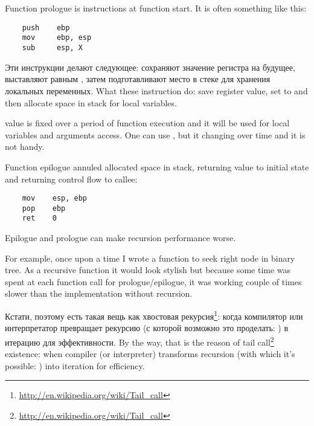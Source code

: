 ﻿\section{}
\label{sec:prologepilog}

{Function prologue is instructions at function start. It is often something like this:}

\begin{lstlisting}
    push    ebp
    mov     ebp, esp
    sub     esp, X
\end{lstlisting}

\IFRU
{Эти инструкции делают следующее: сохраняют значение регистра \EBP на будущее, выставляют \EBP равным \ESP, 
затем подготавливают место в стеке для хранения локальных переменных.}
{What these instruction do: save \EBP register value, set \EBP to \ESP and then allocate space in stack 
for local variables.}

{\EBP value is fixed over a period of function execution and it will be used for local variables and 
arguments access. 
One can use \ESP, but it changing over time and it is not handy.}

{Function epilogue annuled allocated space in stack, returning \EBP value to initial state 
and returning control flow to callee:}

\begin{lstlisting}
    mov    esp, ebp
    pop    ebp
    ret    0
\end{lstlisting}

{Epilogue and prologue can make recursion performance worse.

For example, once upon a time I wrote a function to seek right node in binary tree. 
As a recursive function it would look stylish but because some time was spent at each function call
for prologue/epilogue, it was working couple of times slower than the implementation 
without recursion.}

\newcommand{\URLT}{\url{http://en.wikipedia.org/wiki/Tail_call}}
\IFRU
{Кстати, поэтому есть такая вещь как хвостовая рекурсия\footnote{\URLT}: 
когда компилятор или интерпретатор превращает рекурсию (с которой возможно это проделать: 
) в итерацию для эффективности.}
{By the way, that is the reason of tail call\footnote{\URLT} existence: when compiler (or interpreter) 
transforms recursion (with which it's possible: ) into iteration for efficiency.}
